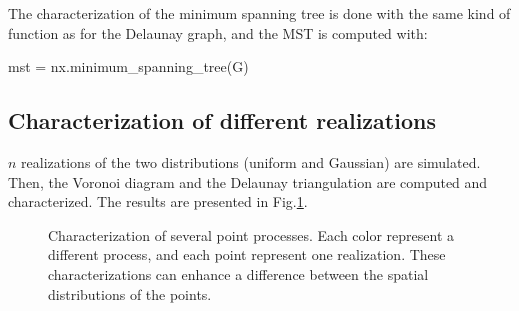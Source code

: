 The characterization of the minimum spanning tree is done with the same kind of function as for the Delaunay graph, and the MST is computed with:
\begin{python}
mst = nx.minimum_spanning_tree(G)
\end{python}

\subsection{Characterization of different realizations}
$n$ realizations of the two distributions (uniform and Gaussian) are simulated. Then, the Voronoi diagram and the Delaunay  triangulation are computed and characterized. The results are presented in Fig.\ref{fig:point_processes_voronoi:python:characterization}. 
% 
%             
%             
%             
%      
%         

\begin{figure}[H]
 \centering\caption{Characterization of several point processes. Each color represent a different process, and each point represent one realization. These characterizations can enhance a difference between the spatial distributions of the points.}%
 \hfill
 
 \label{fig:point_processes_voronoi:python:characterization}%
\end{figure}
